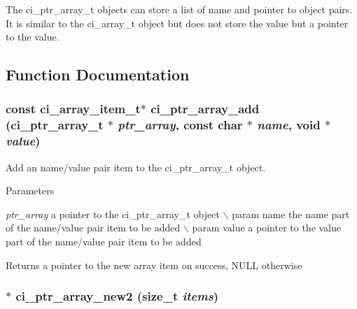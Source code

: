 The ci\_\-ptr\_\-array\_\-t objects can store a list of name and pointer to object pairs. It is similar to the ci\_\-array\_\-t object but does not store the value but a pointer to the value. 

\subsection{Function Documentation}
\hypertarget{group__PTR__ARRAYS_gadf1a428806069e4d640dc7011ab3a340}{
\subsubsection[{ci\_\-ptr\_\-array\_\-add}]{\setlength{\rightskip}{0pt plus 5cm}const ci\_\-array\_\-item\_\-t$\ast$ ci\_\-ptr\_\-array\_\-add ({\bf ci\_\-ptr\_\-array\_\-t} $\ast$ {\em ptr\_\-array}, \/  const char $\ast$ {\em name}, \/  void $\ast$ {\em value})}}
\label{group__PTR__ARRAYS_gadf1a428806069e4d640dc7011ab3a340}


Add an name/value pair item to the ci\_\-ptr\_\-array\_\-t object. 
\begin{DoxyParams}{Parameters}
\item[{\em ptr\_\-array}]a pointer to the ci\_\-ptr\_\-array\_\-t object $\backslash$ param name the name part of the name/value pair item to be added $\backslash$ param value a pointer to the value part of the name/value pair item to be added \end{DoxyParams}
\begin{DoxyReturn}{Returns}
a pointer to the new array item on success, NULL otherwise 
\end{DoxyReturn}
\hypertarget{group__PTR__ARRAYS_ga367de955f3f27b4abd93516f3222a897}{
\subsubsection[{ci\_\-ptr\_\-array\_\-new2}]{$\ast$ ci\_\-ptr\_\-array\_\-new2 (size\_\-t {\em items})}}
\label{group__PTR__ARRAYS_ga367de955f3f27b4abd93516f3222a897}


